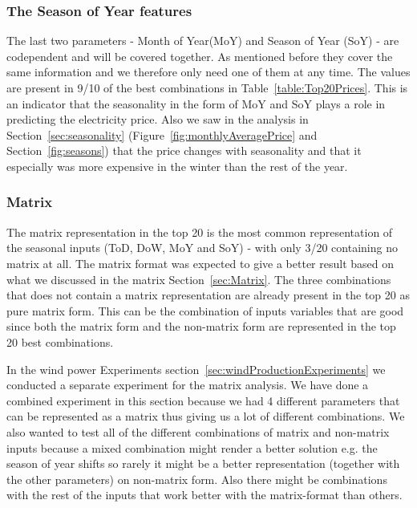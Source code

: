 \subsubsection{The Season of Year features}
The last two parameters - Month of Year(MoY) and Season of Year (SoY) - are codependent and will be covered together. As mentioned before they cover the same information and we therefore only need one of them at any time. The values are present in 9/10 of the best combinations in Table~\ref{table:Top20Prices}. This is an indicator that the seasonality in the form of MoY and SoY plays a role in predicting the electricity price. Also we saw in the analysis in Section~\ref{sec:seasonality} (Figure~\ref{fig:monthlyAveragePrice} and Section~\ref{fig:seasons}) that the price changes with seasonality and that it especially was more expensive in the winter than the rest of the year.

\subsubsection{Matrix}
The matrix representation in the top 20 is the most common representation of the seasonal inputs (ToD, DoW, MoY and SoY) - with only 3/20 containing no matrix at all. The matrix format was expected to give a better result based on what we discussed in the matrix Section~\ref{sec:Matrix}. The three combinations that does not contain a matrix representation are already present in the top 20 as pure matrix form. This can be the combination of inputs variables that are good since both the matrix form and the non-matrix form are represented in the top 20 best combinations.

In the wind power Experiments section~\ref{sec:windProductionExperiments} we conducted a separate experiment for the matrix analysis. We have done a combined experiment in this section because we had 4 different parameters that can be represented as a matrix thus giving us a lot of different combinations. We also wanted to test all of the different combinations of matrix and non-matrix inputs because a mixed combination might render a better solution e.g. the season of year shifts so rarely it might be a better representation (together with the other parameters) on non-matrix form. Also there might be combinations with the rest of the inputs that work better with the matrix-format than others. 

